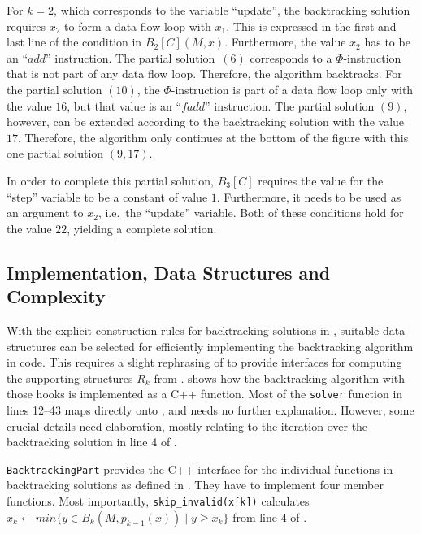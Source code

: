     For $k=2$, which corresponds to the variable ``update'', the backtracking
    solution requires $x_2$ to form a data flow loop with $x_1$.
    This is expressed  in the first and last line of the condition in
    $B_2[C](M,x)$.
    Furthermore, the value $x_2$ has to be an ``$add$'' instruction.
    The partial solution~$(6)$ corresponds to a $\Phi$-instruction that is not
    part of any data flow loop.
    Therefore, the algorithm backtracks.
    For the partial solution $(10)$, the $\Phi$-instruction is part of a data
    flow loop only with the value $16$, but that value is an ``$fadd$''
    instruction.
    The partial solution $(9)$, however, can be extended according to the
    backtracking solution with the value $17$.
    Therefore, the algorithm only continues at the bottom of the figure with
    this one partial solution $(9,17)$.

    In order to complete this partial solution, $B_3[C]$ requires the value for
    the ``step'' variable to be a constant of value $1$.
    Furthermore, it needs to be used as an argument to $x_2$, i.e.\ the
    ``update'' variable.
    Both of these conditions hold for the value $22$, yielding a complete
    solution.

\subsection{Implementation, Data Structures and Complexity}
\label{subsec:impl}

\begin{figure}[p]
    
\end{figure}

    With the explicit construction rules for backtracking solutions in
    , suitable data structures
    can be selected for efficiently implementing the
    backtracking algorithm in code.
    This requires a slight rephrasing of  to provide
    interfaces for computing the supporting structures $R_k$ from
    .
     shows how the backtracking algorithm with those hooks is
    implemented as a C++ function.
    Most of the \texttt{solver} function in lines 12--43 maps directly onto
    , and needs no further explanation.
    However, some crucial details need elaboration, mostly relating to the
    iteration over the backtracking solution in line 4 of .

    {\tt BacktrackingPart} provides the C++ interface for the individual
    functions in backtracking solutions as defined in .
    They have to implement four member functions.
    Most importantly, \texttt{skip\_invalid(x[k])} calculates
    $x_k\gets min\{y\in B_k(M,p_{k-1}(x))\mid y\geq x_k\}$
    from line 4 of .


